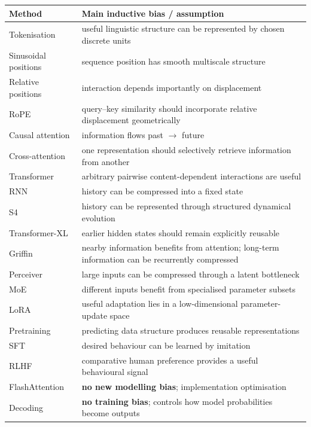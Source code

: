 \begin{center}
\small
\begin{longtable}{@{}L{.24\linewidth}L{.68\linewidth}@{}}
\toprule
\textbf{Method} & \textbf{Main inductive bias / assumption} \\
\midrule
\endhead
Tokenisation & useful linguistic structure can be represented by chosen discrete units \\
Sinusoidal positions & sequence position has smooth multiscale structure \\
Relative positions & interaction depends importantly on displacement \\
RoPE & query--key similarity should incorporate relative displacement geometrically \\
Causal attention & information flows past $\rightarrow$ future \\
Cross-attention & one representation should selectively retrieve information from another \\
Transformer & arbitrary pairwise content-dependent interactions are useful \\
RNN & history can be compressed into a fixed state \\
S4 & history can be represented through structured dynamical evolution \\
Transformer-XL & earlier hidden states should remain explicitly reusable \\
Griffin & nearby information benefits from attention; long-term information can be recurrently compressed \\
Perceiver & large inputs can be compressed through a latent bottleneck \\
MoE & different inputs benefit from specialised parameter subsets \\
LoRA & useful adaptation lies in a low-dimensional parameter-update space \\
Pretraining & predicting data structure produces reusable representations \\
SFT & desired behaviour can be learned by imitation \\
RLHF & comparative human preference provides a useful behavioural signal \\
FlashAttention & \textbf{no new modelling bias}; implementation optimisation \\
Decoding & \textbf{no training bias}; controls how model probabilities become outputs \\
\bottomrule
\end{longtable}
\end{center}


